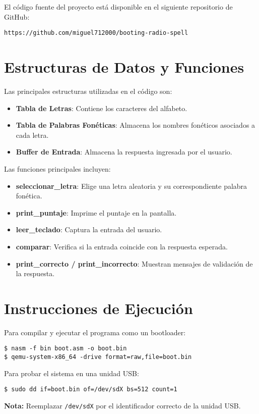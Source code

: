 \documentclass[conference]{IEEEtran}
\begin{document}
El código fuente del proyecto está disponible en el siguiente repositorio de GitHub:
\begin{lstlisting}
https://github.com/miguel712000/booting-radio-spell
\end{lstlisting}

\section{Estructuras de Datos y Funciones}
Las principales estructuras utilizadas en el código son:
\begin{itemize}
    \item \textbf{Tabla de Letras}: Contiene los caracteres del alfabeto.
    \item \textbf{Tabla de Palabras Fonéticas}: Almacena los nombres fonéticos asociados a cada letra.
    \item \textbf{Buffer de Entrada}: Almacena la respuesta ingresada por el usuario.
\end{itemize}

Las funciones principales incluyen:
\begin{itemize}
    \item \textbf{seleccionar\_letra}: Elige una letra aleatoria y su correspondiente palabra fonética.
    \item \textbf{print\_puntaje}: Imprime el puntaje en la pantalla.
    \item \textbf{leer\_teclado}: Captura la entrada del usuario.
    \item \textbf{comparar}: Verifica si la entrada coincide con la respuesta esperada.
    \item \textbf{print\_correcto / print\_incorrecto}: Muestran mensajes de validación de la respuesta.
\end{itemize}

\section{Instrucciones de Ejecución}
Para compilar y ejecutar el programa como un bootloader:
\begin{lstlisting}
$ nasm -f bin boot.asm -o boot.bin
$ qemu-system-x86_64 -drive format=raw,file=boot.bin
\end{lstlisting}

Para probar el sistema en una unidad USB:
\begin{lstlisting}
$ sudo dd if=boot.bin of=/dev/sdX bs=512 count=1
\end{lstlisting}
\textbf{Nota:} Reemplazar \texttt{/dev/sdX} por el identificador correcto de la unidad USB.
\end{document}
